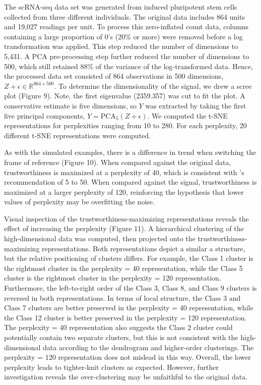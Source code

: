 \documentclass{article}
\begin{document}
The scRNA-seq data set was generated from induced pluripotent stem cells collected from three different individuals. The original data includes 864 units and 19,027 readings per unit. To process this zero-inflated count data, columns containing a large proportion of 0's (20\% or more) were removed before a log transformation was applied. This step reduced the number of dimensions to 5,431. A PCA pre-processing step further reduced the number of dimensions to 500, which still retained 88\% of the variance of the log-transformed data. Hence, the processed data set consisted of 864 observations in 500 dimensions, $Z + \epsilon \in \mathbb{R}^{864 \times 500}$. To determine the dimensionality of the signal, we drew a scree plot (Figure 9). Note, the first eigenvalue (2359.357) was cut to fit the plot. A conservative estimate is five dimensions, so $Y$ was extracted by taking the first five principal components, $Y = \textrm{PCA}_5(Z + \epsilon)$. We computed the t-SNE representations for perplexities ranging from 10 to 280. For each perplexity, 20 different t-SNE representations were computed.

As with the simulated examples, there is a difference in trend when switching the frame of reference (Figure 10). When compared against the original data, trustworthiness is maximized at a perplexity of 40, which is consistent with \cite{t-SNE}'s recommendation of 5 to 50. When compared against the signal, trustworthiness is maximized at a larger perplexity of 120, reinforcing the hypothesis that lower values of perplexity may be overfitting the noise.

Visual inspection of the trustworthiness-maximizing representations reveals the effect of increasing the perplexity (Figure 11). A hierarchical clustering of the high-dimensional data was computed, then projected onto the trustworthiness-maximizing representations. Both representations depict a similar a structure, but the relative positioning of clusters differs. For example, the Class 1 cluster is the rightmost cluster in the perplexity = 40 representation, while the Class 5 cluster is the rightmost cluster in the perplexity = 120 representation. Furthermore, the left-to-right order of the Class 3, Class 8, and Class 9 clusters is reversed in both representations. In terms of local structure, the Class 3 and Class 7 clusters are better preserved in the perplexity = 40 representation, while the Class 12 cluster is better preserved in the perplexity = 120 representation. The perplexity = 40 representation also suggests the Class 2 cluster could potentially contain two separate clusters, but this is not consistent with the high-dimensional data according to the dendrogram and higher-order clusterings. The perplexity = 120 representation does not mislead in this way. Overall, the lower perplexity leads to tighter-knit clusters as expected. However, further investigation reveals the over-clustering may be unfaithful to the original data.
\end{document}

